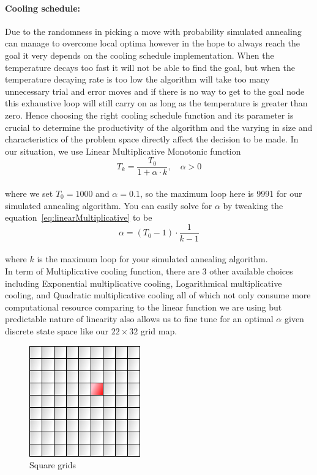 \documentclass[a4paper]{article}
\begin{document}
\paragraph{Cooling schedule:} Due to the randomness in picking a move with probability simulated annealing can manage to overcome local optima however in the hope to always reach the goal it very depends on the cooling schedule implementation. When the temperature decays too fast it will not be able to find the goal, but when the temperature decaying rate is too low the algorithm will take too many unnecessary trial and error moves and if there is no way to get to the goal node this exhaustive loop will still carry on as long as the temperature is greater than zero. Hence choosing the right cooling schedule function and its parameter is crucial to determine the productivity of the algorithm and the varying in size and characteristics of the problem space directly affect the decision to be made. In our situation, we use Linear Multiplicative Monotonic function \\

\begin{equation} \label{eq:linearMultiplicative}
T_k = \frac{T_0}{1 + \alpha \cdot k}, \quad \alpha > 0
\end{equation}
\\
where we set $T_0 = 1000$ and $\alpha = 0.1$, so the maximum loop here is 9991 for our simulated annealing algorithm. You can easily solve for $\alpha$ by tweaking the equation~\ref{eq:linearMultiplicative} to be \\

\begin{equation}
\alpha = \left(T_0-1\right) \cdot \frac{1}{k-1}
\end{equation}
\\
where $k$ is the maximum loop for your simulated annealing algorithm. \\

In term of Multiplicative cooling function, there are 3 other available choices including Exponential multiplicative cooling, Logarithmical multiplicative cooling, and Quadratic multiplicative cooling all of which not only consume more computational resource comparing to the linear function we are using but predictable nature of linearity also allows us to fine tune for an optimal $\alpha$ given discrete state space like our $22 \times 32$ grid map. \\

\begin{figure}[h!]
  \centering
    \includegraphics[scale=.6]{images/square-grid.png}
  \caption{Square grids}
\end{figure}
\end{document}
